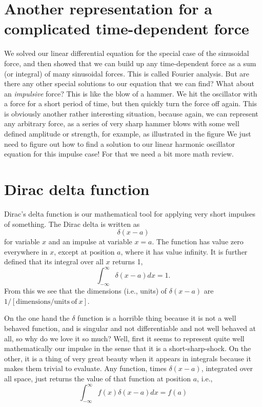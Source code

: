 \documentclass[]{revtex4}
\newcommand{\sm}[1]{{\[#1\]}}
\begin{document}
\section*{Another representation for a complicated time-dependent force}
We solved our linear differential equation for the special case of the sinusoidal force, and then showed that we can build up any time-dependent force as a
sum (or integral) of many sinusoidal forces.  This is called Fourier analysis.  But are there any other special solutions to our equation that we can find?
What about an {\it impulsive} force?  This is like the blow of a hammer.  We hit the oscillator with a force for a short period of time, but then quickly turn the
force off again.  This is obviously another rather interesting situation, because again, we can represent any arbitrary force, as a series of very sharp hammer
blows with some well defined amplitude or strength, for example, as illustrated in the figure
%
%
We just need to figure out how to find a solution to our linear harmonic oscillator equation for this impulse case!  For that we need a bit
more math review.

\section*{Dirac delta function}
Dirac's delta function is our mathematical tool for applying very short impulses of something.  The Dirac delta is written as
\sm{\delta(x-a)}
for variable $x$ and an impulse at variable $x =a$.  The function has value zero everywhere in $x$, except at position $a$, where it has value
infinity. It is further defined that its integral over all $x$ returns 1,
\sm{\int_{-\infty}^\infty \delta(x-a)dx = 1.}
From this we see that the dimensions (i.e., units) of $\delta(x-a)$ are $1/[\mathrm{dimensions/units\ of\ } x]$.

On the one hand the $\delta$ function is a horrible thing because it is not a well behaved function, and is
singular and not differentiable and not well behaved at all, so why do we love it so much?  Well, first it seems to represent quite well
mathematically our impulse in the sense that it is a short-sharp-shock.  On the other, it is a thing of very great beauty when it appears in integrals
because it makes them trivial to evaluate.  Any function, times $\delta (x-a)$, integrated over all space, just returns the value of that
function at position $a$, i.e.,
\sm{\int_{-\infty}^\infty f(x)\delta(x-a)dx = f(a)}
\end{document}
